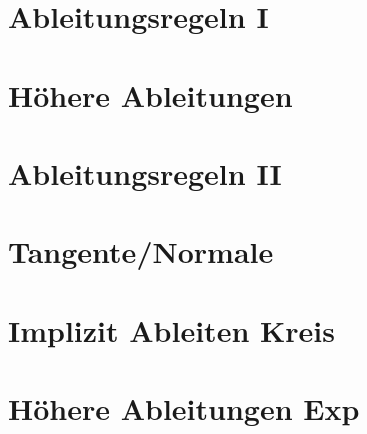 \section{Ableitungsregeln I}


\section{Höhere Ableitungen}


\section{Ableitungsregeln II}


\section{Tangente/Normale}


\section{Implizit Ableiten Kreis}


\section{Höhere Ableitungen Exp}

